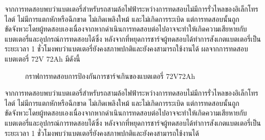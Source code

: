 จากการทดสอบพบว่าแบตเตอรี่สำหรับรถสามล้อไฟฟ้าระหว่างการทดสอบไม่มีการรั่วไหลของอิเล็กโทรไลต์ ไม่มีการแตกหักหรือฉีกขาด ไม่เกิดเพลิงใหม้ และไม่เกิดการระเบิด
แต่การทดสอบนั้นถูกขัดจังหวะโดยผู้ทดสอบเองเนื่องจากหากดำเนินการทดสอบต่อไปอาจจะทำให้เกิดความเสียหายกับแบตเตอรี่และอุปกรณ์การทดสอบได้ซึ่ง
หลังจากที่หยุดการชาร์จผู้ทดสอบได้ทำการสังเกตแบตเตอรี่เป็นระยะเวลา 1 ชั่วโมงพบว่าแบตเตอรี่ยังคงสภาพปกติและยังคงสามารถใช้งานได้
\newline
ผลจากการทดสอบแบตเตอรี่ 72V 72Ah มีดังนี้
\begin{center}
	\begin{figure}[H]
		\centering
		\captionsetup{justification=centering,margin=2cm}
		\caption{กราฟการทดสอบการป้องกันการชาร์จเกินของแบตเตอรี่ 72V72Ah}
	\end{figure}
\end{center}
จากการทดสอบพบว่าแบตเตอรี่สำหรับรถสามล้อไฟฟ้าระหว่างการทดสอบไม่มีการรั่วไหลของอิเล็กโทรไลต์ ไม่มีการแตกหักหรือฉีกขาด ไม่เกิดเพลิงใหม้ และไม่เกิดการระเบิด
แต่การทดสอบนั้นถูกขัดจังหวะโดยผู้ทดสอบเองเนื่องจากหากดำเนินการทดสอบต่อไปอาจจะทำให้เกิดความเสียหายกับแบตเตอรี่และอุปกรณ์การทดสอบได้ซึ่ง
หลังจากที่หยุดการชาร์จผู้ทดสอบได้ทำการสังเกตแบตเตอรี่เป็นระยะเวลา 1 ชั่วโมงพบว่าแบตเตอรี่ยังคงสภาพปกติและยังคงสามารถใช้งานได้
